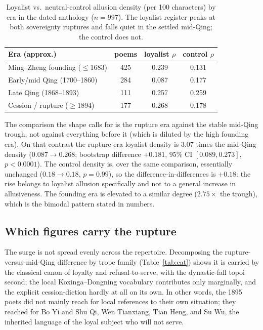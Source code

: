 \documentclass[10pt,twocolumn]{article}
\begin{document}
\begin{table}[t]
\centering
\footnotesize
\caption{Loyalist vs.\ neutral-control allusion density (per 100 characters) by era in the
dated anthology ($n=997$). The loyalist register peaks at both sovereignty ruptures and
falls quiet in the settled mid-Qing; the control does not.}
\label{tab:era}
\begin{tabular}{lccc}
\toprule
Era (approx.) & poems & loyalist $\rho$ & control $\rho$ \\
\midrule
Ming--Zheng founding ($\leq$1683) & 425 & 0.239 & 0.131 \\
Early/mid Qing (1700--1860)       & 284 & 0.087 & 0.177 \\
Late Qing (1868--1893)            & 111 & 0.257 & 0.259 \\
Cession / rupture ($\geq$1894)    & 177 & 0.268 & 0.178 \\
\bottomrule
\end{tabular}
\end{table}

The comparison the shape calls for is the rupture era against the stable mid-Qing trough,
not against everything before it (which is diluted by the high founding era). On that
contrast the rupture-era loyalist density is $3.07$ times the mid-Qing density
($0.087 \to 0.268$; bootstrap difference $+0.181$, $95\%$ CI $[0.089, 0.273]$, $p<0.0001$).
The control density is, over the same comparison, essentially unchanged
($0.18 \to 0.18$, $p=0.99$), so the difference-in-differences is $+0.18$: the rise belongs to
loyalist allusion specifically and not to a general increase in allusiveness. The founding
era is elevated to a similar degree ($2.75\times$ the trough), which is the bimodal pattern
stated in numbers.

\subsection{Which figures carry the rupture}
The surge is not spread evenly across the repertoire. Decomposing the rupture-versus-mid-Qing
difference by trope family (Table~\ref{tab:cat}) shows it is carried by the classical canon
of loyalty and refusal-to-serve, with the dynastic-fall topoi second; the local
Koxinga--Dongning vocabulary contributes only marginally, and the explicit cession-diction
hardly at all on its own. In other words, the 1895 poets did not mainly reach for local
references to their own situation; they reached for Bo Yi and Shu Qi, Wen Tianxiang, Tian
Heng, and Su Wu, the inherited language of the loyal subject who will not serve.
\end{document}
